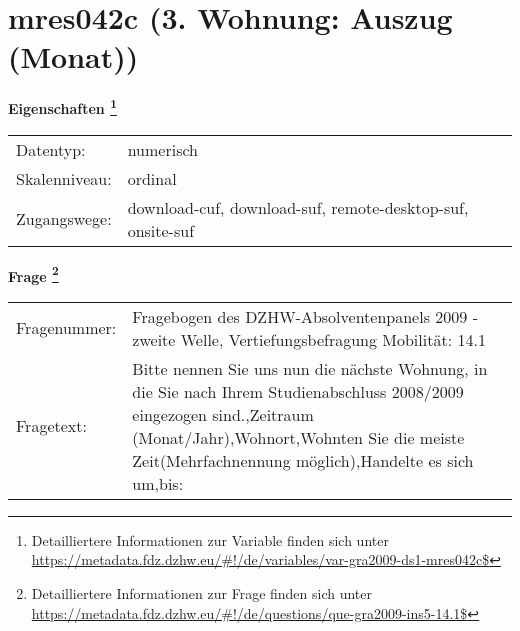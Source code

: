 
    \setcounter{footnote}{0}

    \vspace*{-1.8cm}
	\section{mres042c (3. Wohnung: Auszug (Monat))}
	\label{section:mres042c}



    \vspace*{0.5cm}
    \noindent\textbf{Eigenschaften
	\footnote{Detailliertere Informationen zur Variable finden sich unter
		\url{https://metadata.fdz.dzhw.eu/\#!/de/variables/var-gra2009-ds1-mres042c$}}}\\
	\begin{tabularx}{\hsize}{@{}lX}
	Datentyp: & numerisch \\
	Skalenniveau: & ordinal \\
	Zugangswege: &
	  download-cuf, 
	  download-suf, 
	  remote-desktop-suf, 
	  onsite-suf
 \\
    \end{tabularx}



				\vspace*{0.5cm}
                \noindent\textbf{Frage
	                \footnote{Detailliertere Informationen zur Frage finden sich unter
		              \url{https://metadata.fdz.dzhw.eu/\#!/de/questions/que-gra2009-ins5-14.1$}}}\\
				\begin{tabularx}{\hsize}{@{}lX}
					Fragenummer: &
					  Fragebogen des DZHW-Absolventenpanels 2009 - zweite Welle, Vertiefungsbefragung Mobilität:
					  14.1
 \\
					Fragetext: & Bitte nennen Sie uns nun die nächste Wohnung, in die Sie nach Ihrem Studienabschluss 2008/2009 eingezogen sind.,Zeitraum (Monat/Jahr),Wohnort,Wohnten Sie die meiste Zeit(Mehrfachnennung möglich),Handelte es sich um,bis: \\
				\end{tabularx}





